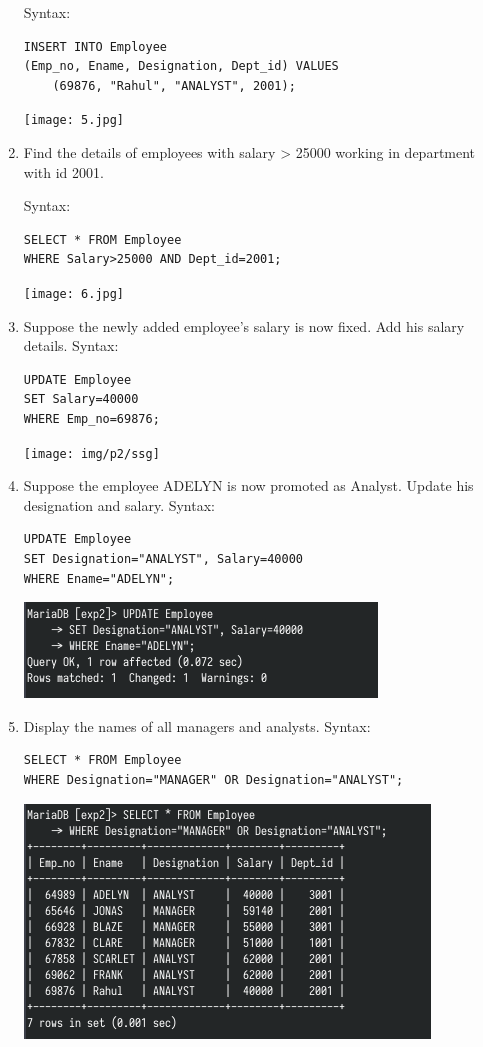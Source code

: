 \documentclass[13pt,oneside]{book}
\begin{document}
\begin{enumerate}
    Syntax:
    \begin{verbatim}
INSERT INTO Employee
(Emp_no, Ename, Designation, Dept_id) VALUES
	(69876, "Rahul", "ANALYST", 2001);
    \end{verbatim}
    \texttt{[image: 5.jpg]}

\item
Find the details of employees with salary > 25000 working in department
with id 2001.

Syntax:
\begin{verbatim}
SELECT * FROM Employee
WHERE Salary>25000 AND Dept_id=2001;
\end{verbatim}
\texttt{[image: 6.jpg]}

\item
		Suppose the newly added employee's salary is now fixed. Add his salary
details.
		Syntax: 
		\begin{verbatim}
UPDATE Employee
SET Salary=40000
WHERE Emp_no=69876;
		\end{verbatim}
		\texttt{[image: img/p2/ssg]}
		
	\item
	Suppose the employee ADELYN is now promoted as Analyst. Update his
designation and salary.
Syntax:
    \begin{verbatim}
UPDATE Employee
SET Designation="ANALYST", Salary=40000
WHERE Ename="ADELYN";
    \end{verbatim}
	\includegraphics[]{img/p2/ss8.png}
	
	\item
	Display the names of all managers and analysts.
Syntax:
    \begin{verbatim}
SELECT * FROM Employee
WHERE Designation="MANAGER" OR Designation="ANALYST";
    \end{verbatim}
	\includegraphics[]{img/p2/ss9.png}
	

\end{enumerate}
\end{document}
